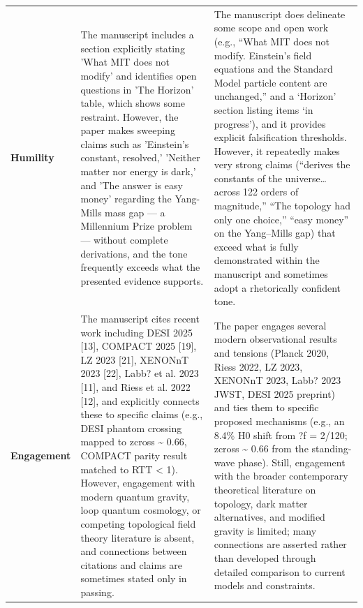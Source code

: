 \documentclass[11pt]{article}
\begin{document}
\begin{longtable}{@{} p{2.2cm} p{6.3cm} p{6.3cm} @{}}
\rowcolor{rowgray}
\textbf{Humility} &
The manuscript includes a section explicitly stating 'What MIT does not modify' and identifies open questions in 'The Horizon' table, which shows some restraint. However, the paper makes sweeping claims such as 'Einstein's constant, resolved,' 'Neither matter nor energy is dark,' and 'The answer is easy money' regarding the Yang-Mills mass gap --- a Millennium Prize problem --- without complete derivations, and the tone frequently exceeds what the presented evidence supports. &
The manuscript does delineate some scope and open work (e.g., ``What MIT does not modify. Einstein's field equations and the Standard Model particle content are unchanged,'' and a `Horizon' section listing items `in progress'), and it provides explicit falsification thresholds. However, it repeatedly makes very strong claims (``derives the constants of the universe\ldots{} across 122 orders of magnitude,'' ``The topology had only one choice,'' ``easy money'' on the Yang--Mills gap) that exceed what is fully demonstrated within the manuscript and sometimes adopt a rhetorically confident tone. \\[6pt]

\textbf{Engagement} &
The manuscript cites recent work including DESI 2025 [13], COMPACT 2025 [19], LZ 2023 [21], XENONnT 2023 [22], Labb? et al. 2023 [11], and Riess et al. 2022 [12], and explicitly connects these to specific claims (e.g., DESI phantom crossing mapped to zcross \textasciitilde{} 0.66, COMPACT parity result matched to RTT < 1). However, engagement with modern quantum gravity, loop quantum cosmology, or competing topological field theory literature is absent, and connections between citations and claims are sometimes stated only in passing. &
The paper engages several modern observational results and tensions (Planck 2020, Riess 2022, LZ 2023, XENONnT 2023, Labb? 2023 JWST, DESI 2025 preprint) and ties them to specific proposed mechanisms (e.g., an 8.4\% H0 shift from ?f = 2/120; zcross \textasciitilde{} 0.66 from the standing-wave phase). Still, engagement with the broader contemporary theoretical literature on topology, dark matter alternatives, and modified gravity is limited; many connections are asserted rather than developed through detailed comparison to current models and constraints. \\[6pt]


\end{longtable}
\end{document}
